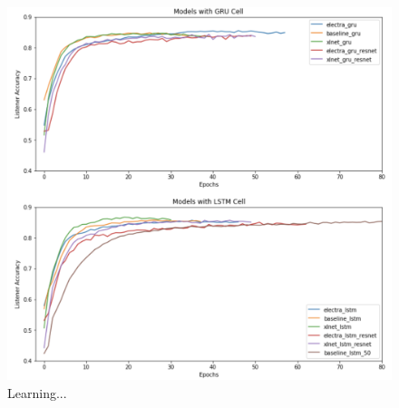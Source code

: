 \begin{figure}[ht]
\centering
\includegraphics[width=\textwidth]{assets/learning.png}
\caption[Learning]
{Learning...}
\label{figure:learning}
\end{figure}




